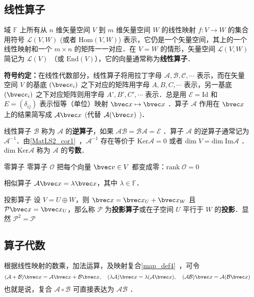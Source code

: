 
\subsection{线性算子}
域 $\mathbb{F}$ 上所有从 $n$ 维矢量空间 $V$ 到 $m$ 维矢量空间 $W$ 的线性映射 $f:V\rightarrow W$ 的集合用符号 $\mathcal{L}(V,W)$ (或者 $\mathrm{Hom}(V,W)$) 表示，它仍是一个矢量空间，其上的一个线性映射和一个 $m\times n$ 的矩阵一一对应．在 $V=W$ 的情形，矢量空间 $\mathcal{L}(V,W)$ 简记为 $\mathcal{L}(V)$ （或 $\mathrm{End}(V)$），它的向量通常称为\textbf{线性算子}．

\textbf{符号约定：}在线性代数部分，线性算子将用拉丁字母 $\mathcal{A,B,C,\cdots}$ 表示，而在矢量空间 $V$ 的基底 $(\bvec e_i)$ 之下对应的矩阵用字母 $A,B,C,\cdots$ 表示，另一基底 $(\bvec e_i)$ 之下对应矩阵则用字母 $A',B',C',\cdots$ 表示．总是用 $\mathcal{E}=\mathrm{Id}$ 和 $E=(\delta_{ij})$ 表示恒等（单位）映射 $\bvec x\mapsto \bvec x$ ．算子 $\mathcal{A}$ 作用在 $\bvec x$ 上的结果简写成 $\mathcal{A}\bvec x$ (代替 $\mathcal{A}(\bvec x)$ )．

线性算子 $\mathcal{B}$ 称为 $\mathcal{A}$ 的\textbf{逆算子}，如果 $\mathcal{AB}=\mathcal{BA}=\mathcal{E}$ ．算子 $\mathcal{A}$ 的逆算子通常记为 $\mathcal{A}^{-1}$．由\autoref{MatLS2_cor1}~，$\mathcal{A}^{-1}$ 存在等价于 $\mathrm{Ker}\mathcal{A}=0$ 或者 $\mathrm{dim}\;V=\mathrm{dim\;Im}\mathcal{A}$ ．$\mathrm{dim\;Ker}\mathcal{A}$ 称为 $\mathcal{A}$ 的\textbf{亏数}．
\begin{example}{零算子}
零算子 $\mathcal{O}$ 把每个向量 $\bvec v\in V$ 都变成零：$\mathrm{rank}\; \mathcal{O}=0$
\end{example}
\begin{example}{相似算子}
$\mathcal{A}\bvec x=\lambda\bvec x$，其中 $\lambda\in\mathbb{F}$．
\end{example}
\begin{example}{投影算子}
设 $V=U\oplus W$，则 $\bvec x=\bvec x_U+\bvec x_W$ 且 $\mathcal{P}\bvec x=\bvec x_U$，那么称 $\mathcal{P}$ 为\textbf{投影算子}或在子空间 $U$ 平行于 $W$ 的\textbf{投影}．显然 $\mathcal{P}^2=\mathcal{P}$
\end{example}
\subsection{算子代数}
根据线性映射的数乘，加法运算，及映射复合\autoref{map_def4}~，可令
\begin{equation}\label{LiOper_eq1}
(\mathcal{A}+\mathcal{B})\bvec x=\mathcal{A}\bvec x+\mathcal{B}\bvec x,\quad (\lambda\mathcal A)\bvec x=\lambda(\mathcal A\bvec x),\quad (\mathcal{AB})\bvec x=\mathcal{A}(\mathcal{B}\bvec x)
\end{equation}
也就是说，复合 $\mathcal{A\circ B}$ 可直接表达为 $\mathcal{AB}$ ．

